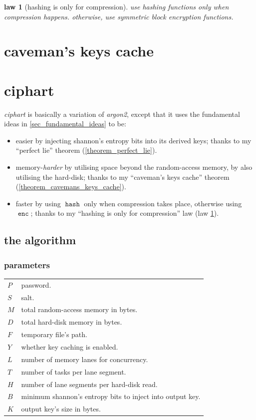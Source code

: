\documentclass[twocolumn]{article}
\newtheorem{law}{law}[section]
\DeclareMathOperator{\enc}{\mathtt{enc}}
\DeclareMathOperator{\hash}{\mathtt{hash}}
\begin{document}
\begin{law}[hashing is only for compression]\label{law_simplification}
    use hashing functions only when compression happens.  otherwise, use
    symmetric block encryption functions.
\end{law}


\section{caveman's keys cache}

\section{ciphart}
\emph{ciphart} is basically a variation of \emph{argon2}, except that it
uses the fundamental ideas in \cref{sec_fundamental_ideas} to be:
\begin{itemize}
    \item easier by injecting shannon's entropy bits into its derived keys;
    thanks to my ``perfect lie'' theorem (\cref{theorem_perfect_lie}).

    \item memory-\emph{harder} by utilising space beyond the random-access
    memory, by also utilising the hard-disk; thanks to my ``caveman's keys
    cache'' theorem (\cref{theorem_cavemans_keys_cache}).

    \item faster by using $\hash$ only when compression takes place,
    otherwise using $\enc$; thanks to my ``hashing is only for
    compression'' law (law \ref{law_simplification}).
\end{itemize}

\subsection{the algorithm}
\subsubsection{parameters}
\begin{tabularx}{\columnwidth}{lX}
    $P$ & password.\\
    $S$ & salt.\\
    $M$ & total random-access memory in bytes.\\
    $D$ & total hard-disk memory in bytes.\\
    $F$ & temporary file's path.\\
    $Y$ & whether key caching is enabled.\\
    $L$ & number of memory lanes for concurrency.\\
    $T$ & number of tasks per lane segment.\\
    $H$ & number of lane segments per hard-disk read.\\
    $B$ & minimum shannon's entropy bits to inject into output key.\\
    $K$ & output key's size in bytes.\\
\end{tabularx}
\end{document}
